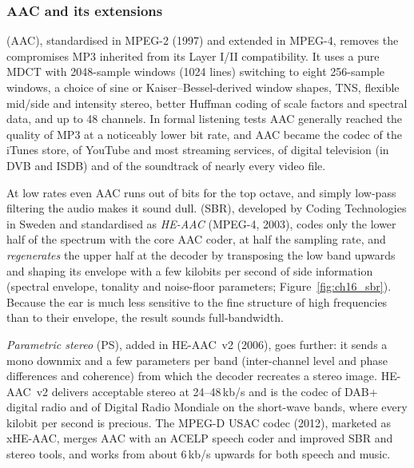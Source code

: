 \subsubsection{AAC and its extensions}

 (AAC), standardised in MPEG-2 (1997) and extended in MPEG-4, removes the
compromises MP3 inherited from its Layer I/II compatibility. It uses a pure MDCT with 2048-sample
windows (1024 lines) switching to eight 256-sample windows, a choice of sine or Kaiser--Bessel-derived
window shapes, TNS, flexible mid/side and intensity stereo, better Huffman coding of scale factors and
spectral data, and up to 48 channels. In formal listening tests AAC generally reached the quality of
MP3 at a noticeably lower bit rate, and AAC became the codec of the iTunes store, of YouTube and most
streaming services, of digital television (in DVB and ISDB) and of the soundtrack of nearly every
video file.

At low rates even AAC runs out of bits for the top octave, and simply low-pass filtering the audio
makes it sound dull.  (SBR), developed by Coding Technologies in Sweden
and standardised as \emph{HE-AAC} (MPEG-4, 2003), codes only the lower half of the spectrum with the core
AAC coder, at half the sampling rate, and \emph{regenerates} the upper half at the decoder by
transposing the low band upwards and shaping its envelope with a few kilobits per second of side
information (spectral envelope, tonality and noise-floor parameters;
Figure~\ref{fig:ch16_sbr}). Because the ear is much less sensitive to the fine structure of high
frequencies than to their envelope, the result sounds full-bandwidth.

\emph{Parametric stereo} (PS), added in HE-AAC~v2 (2006), goes further: it sends a mono downmix and a
few parameters per band (inter-channel level and phase differences and coherence) from which the
decoder recreates a stereo image. HE-AAC~v2 delivers acceptable stereo at 24--48\,kb/s and is the codec
of DAB+ digital radio and of Digital Radio Mondiale on the short-wave bands, where every kilobit per
second is precious. The MPEG-D USAC codec (2012), marketed as xHE-AAC, merges AAC with an ACELP speech
coder and improved SBR and stereo tools, and works from about 6\,kb/s upwards for both speech and
music.


